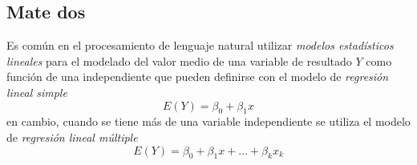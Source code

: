 \subsection{Mate dos}
    Es común en el procesamiento de lenguaje natural utilizar \emph{modelos estadísticos lineales} para el modelado del valor medio de una variable de resultado $Y$ como función de una independiente que pueden definirse con el modelo de \emph{regresión lineal simple}
    \begin{equation}
    E(Y)=\beta_0+\beta_1x
    \end{equation}
    en cambio, cuando se tiene más de una variable independiente se utiliza el modelo de \emph{regresión lineal múltiple}
    \begin{equation}
    E(Y)=\beta_0+\beta_1x+\ldots+\beta_kx_k
    \end{equation}